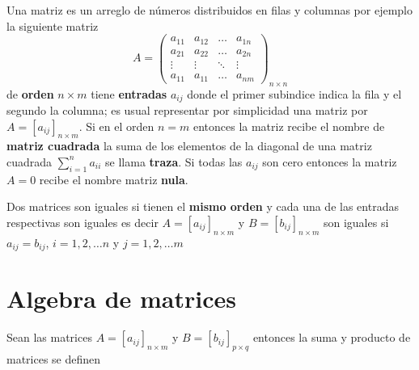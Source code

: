 \documentclass[10pt,]{krantz}
\theoremstyle{definition}
\theoremstyle{definition}
\theoremstyle{definition}
\theoremstyle{remark}
\begin{document}
Una matriz es un arreglo de números distribuidos en filas y columnas por ejemplo la siguiente matriz
\[A=\begin{pmatrix}
a_{11}&a_{12}&\ldots&a_{1n}\\
a_{21}&a_{22}&\ldots&a_{2n}\\
\vdots & \vdots & \ddots &\vdots \\
a_{11}&a_{11}&\ldots&a_{nm}
\end{pmatrix}_{n\times n}\]
de \textbf{orden} \(n\times m\) tiene \textbf{entradas} \(a_{ij}\) donde el primer subindice indica la fila y el segundo la columna; es usual representar por simplicidad una matriz por \(A=[a_{ij}]_{n\times m}\). Si en el orden \(n=m\) entonces la matriz recibe el nombre de \textbf{matriz cuadrada} la suma de los elementos de la diagonal de una matriz cuadrada \(\sum_{i=1}^na_{ii}\) se llama \textbf{traza}. Si todas las \(a_{ij}\) son cero entonces la matriz \(A=0\) recibe el nombre matriz \textbf{nula}.

Dos matrices son iguales si tienen el \textbf{mismo orden} y cada una de las entradas respectivas son iguales es decir \(A=[a_{ij}]_{n\times m}\) y \(B=[b_{ij}]_{n\times m}\) son iguales si \(a_{ij}=b_{ij}\), \(i=1,2,\ldots n\) y \(j=1,2,\ldots m\)

\hypertarget{algebra-de-matrices}{%
\section{Algebra de matrices}\label{algebra-de-matrices}}

Sean las matrices \(A=[a_{ij}]_{n\times m}\) y \(B=[b_{ij}]_{p\times q}\) entonces la suma y producto de matrices se definen
\end{document}
